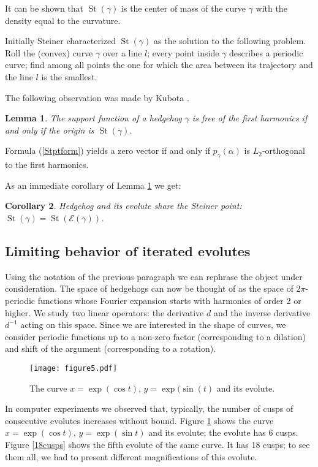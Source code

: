 \documentclass[12pt]{article}
\makeatletter
\newtheorem{lemma}{Lemma}[section]
\newtheorem{corollary}[lemma]{Corollary}
\renewenvironment{proof}[1][\proofname] 
{\par\pushQED{\qed}\normalfont\topsep6\p@\@plus6\p@\relax\trivlist\item[\hskip\labelsep\bfseries#1\@addpunct{.}]\ignorespaces}{\popQED\endtrivlist\@endpefalse}
\newcommand{\g}{{\gamma}}
\newcommand{\St}{\operatorname{St}}
\makeatother
\begin{document}
It can be shown that $\St(\g)$ is the center of mass of the curve $\g$ with the density equal to the curvature.

Initially Steiner \cite{Ste} characterized $\St(\g)$ as the solution to the following problem. Roll the (convex) curve $\g$ over a line $l$; every point inside $\g$ describes a periodic curve; find among all points the one for which the area between its trajectory and the line $l$ is the smallest. 

The following observation was made by Kubota \cite{Ku}.
\begin{lemma}
\label{Stpt}
The support function of a hedgehog $\g$ is free of the first harmonics if and only if the origin is $\St(\g)$.
\end{lemma}

\begin{proof}
Formula (\ref{Stptform}) yields a zero vector if and only if $p_\gamma(\alpha)$ is $L_2$-orthogonal to the first harmonics.
\end{proof}

As an immediate corollary of Lemma \ref{Stpt} we get:

\begin{corollary}
\label{Stptevo}
Hedgehog and its evolute share the Steiner point: $\St(\g)=\St(\mathcal{E}(\g))$. 
\end{corollary}

\subsection{Limiting behavior of iterated evolutes} 
\label{smooth-cycloids}
Using the notation of the previous paragraph we can rephrase the object under consideration. The space of hedgehogs can now be thought of as the space of $2\pi$-periodic functions whose Fourier expansion starts with harmonics of order $2$ or higher. We  study two linear operators: the derivative $d$ and the inverse derivative $d^{-1}$ acting on this space. Since we are interested in the shape of  curves, we  consider periodic functions up to a non-zero factor (corresponding to a dilation) and shift of the argument (corresponding to a rotation).

\begin{figure}[hbtp]
\centering
\texttt{[image: figure5.pdf]}
\caption{The  curve $x=\exp(\cos t),\, y =\exp(\sin(t)$ and its evolute.}\label{6cusps}
\end{figure}

In computer experiments we observed that, typically, the number of cusps of consecutive evolutes increases without bound. Figure \ref{6cusps} shows the curve $x=\exp(\cos t),\, y =\exp(\sin t)$ and its evolute; the evolute has 6 cusps. Figure \ref{18cusps} shows the fifth evolute of the same curve. It has 18 cusps; to see them all, we had to present different magnifications of this evolute.
\end{document}
